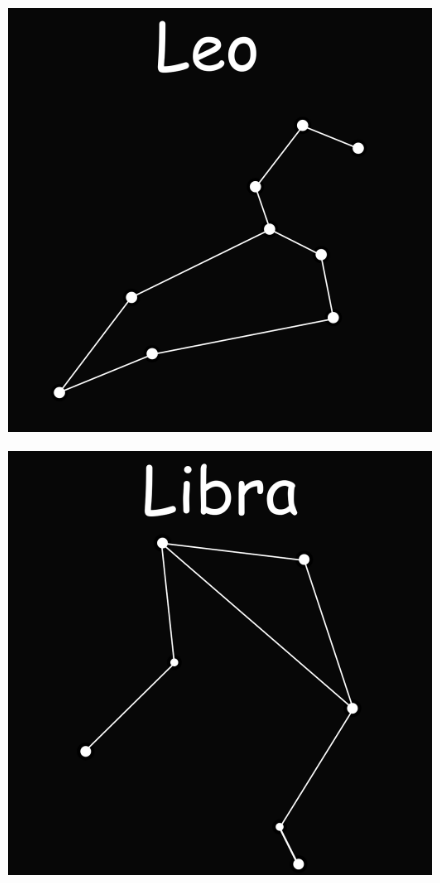 \documentclass{beamer}
\begin{document}
\begin{frame}
 \begin{figure}
   \centering
   \includegraphics[scale=0.2]{Imagenes/Leo_01}
  \end{figure}
\end{frame}

\begin{frame}
 \begin{figure}
   \centering
   \includegraphics[scale=0.2]{Imagenes/Libra_01}
  \end{figure}
\end{frame}
\end{document}
